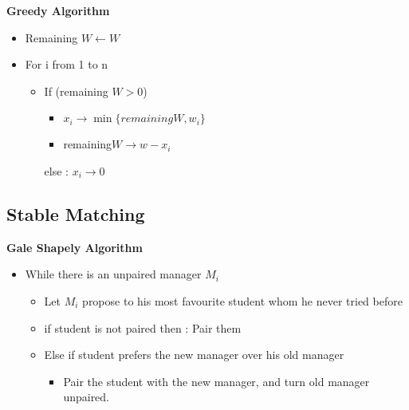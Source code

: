 \documentclass[twoside]{article}
\begin{document}
\textbf{Greedy Algorithm}
\begin{itemize}
\item Remaining \(W \leftarrow W\)
\item For i from 1 to n
\begin{itemize}
\item If (remaining \(W >0\)) 
\begin{itemize}
\item \(x_i \rightarrow \min\{remaining W, w_i\}\)
\item remaining\(W \rightarrow w - x_i\)
\end{itemize}
else : \(x_i \rightarrow 0\)
\end{itemize}
\end{itemize}

\subsection{Stable Matching}

\textbf{Gale Shapely Algorithm}
\begin{itemize}
\item While there is an unpaired manager \(M_i\)
\begin{itemize}
\item Let \(M_i\) propose to his most favourite student whom he never tried before
\item if student is not paired then : Pair them 
\item Else if student prefers the new manager over his old manager 
\begin{itemize}
\item Pair the student with the new manager, and turn old manager unpaired. 
\end{itemize}
\end{itemize}
\end{itemize}
\end{document}
